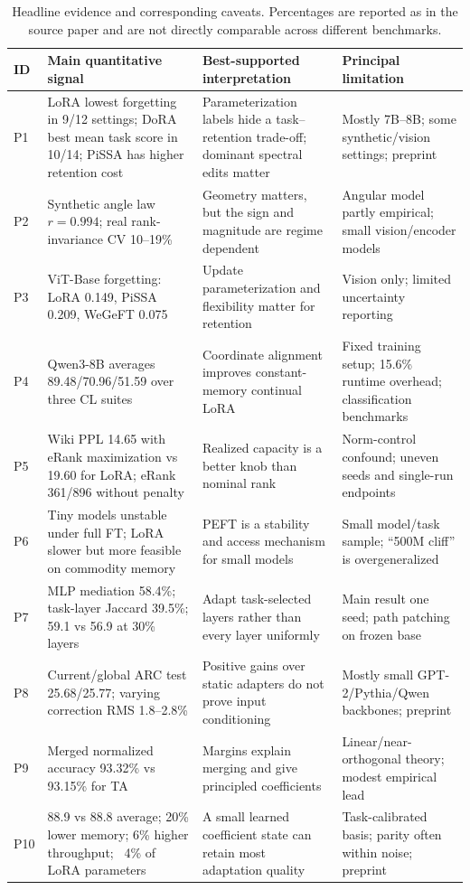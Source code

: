 \documentclass[11pt]{article}
\begin{document}
\begin{table}[t]
\centering
\caption{Headline evidence and corresponding caveats. Percentages are reported as in the source paper and are not directly comparable across different benchmarks.}
\label{tab:results}
\scriptsize
\begin{tabularx}{\textwidth}{@{}p{}p{}X X@{}}
\toprule
\textbf{ID} & \textbf{Main quantitative signal} & \textbf{Best-supported interpretation} & \textbf{Principal limitation} \\
\midrule
P1 & LoRA lowest forgetting in 9/12 settings; DoRA best mean task score in 10/14; PiSSA has higher retention cost & Parameterization labels hide a task--retention trade-off; dominant spectral edits matter & Mostly 7B--8B; some synthetic/vision settings; preprint \\
P2 & Synthetic angle law $r=0.994$; real rank-invariance CV 10--19\% & Geometry matters, but the sign and magnitude are regime dependent & Angular model partly empirical; small vision/encoder models \\
P3 & ViT-Base forgetting: LoRA 0.149, PiSSA 0.209, WeGeFT 0.075 & Update parameterization and flexibility matter for retention & Vision only; limited uncertainty reporting \\
P4 & Qwen3-8B averages 89.48/70.96/51.59 over three CL suites & Coordinate alignment improves constant-memory continual LoRA & Fixed training setup; 15.6\% runtime overhead; classification benchmarks \\
P5 & Wiki PPL 14.65 with eRank maximization vs 19.60 for LoRA; eRank 361/896 without penalty & Realized capacity is a better knob than nominal rank & Norm-control confound; uneven seeds and single-run endpoints \\
P6 & Tiny models unstable under full FT; LoRA slower but more feasible on commodity memory & PEFT is a stability and access mechanism for small models & Small model/task sample; ``500M cliff'' is overgeneralized \\
P7 & MLP mediation 58.4\%; task-layer Jaccard 39.5\%; 59.1 vs 56.9 at 30\% layers & Adapt task-selected layers rather than every layer uniformly & Main result one seed; path patching on frozen base \\
P8 & Current/global ARC test 25.68/25.77; varying correction RMS 1.8--2.8\% & Positive gains over static adapters do not prove input conditioning & Mostly small GPT-2/Pythia/Qwen backbones; preprint \\
P9 & Merged normalized accuracy 93.32\% vs 93.15\% for TA & Margins explain merging and give principled coefficients & Linear/near-orthogonal theory; modest empirical lead \\
P10 & 88.9 vs 88.8 average; 20\% lower memory; 6\% higher throughput; ~4\% of LoRA parameters & A small learned coefficient state can retain most adaptation quality & Task-calibrated basis; parity often within noise; preprint \\
\bottomrule
\end{tabularx}
\end{table}
\end{document}
